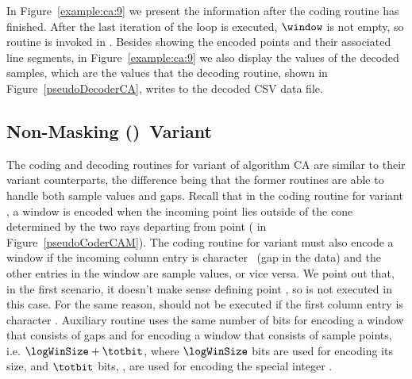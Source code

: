 \vspace{+5pt}


\clearpage


In Figure~\ref{example:ca:9} we present the information after the coding routine has finished. After the last iteration of the loop is executed, $\window$ is not empty, so routine \CAWinEnd is invoked in . Besides showing the encoded points and their associated line segments, in Figure~\ref{example:ca:9} we also display the values of the decoded samples, which are the values that the decoding routine, shown in Figure~\ref{pseudoDecoderCA}, writes to the decoded CSV data file. 


\vspace{+5pt}




\vspace{-10pt}
\subsection{Non-Masking (\NOmaskalgo)\ Variant}
\label{algo:ca:nmvariant}


The coding and decoding routines for variant \NOmaskalgo of algorithm CA are similar to their variant \maskalgo counterparts, the difference being that the former routines are able to handle both sample values and gaps. Recall that in the coding routine for variant \maskalgo, a window is encoded when the incoming point lies outside of the cone determined by the two rays departing from point \archived ( in Figure~\ref{pseudoCoderCAM}). The coding routine for variant \NOmaskalgo must also encode a window if the incoming column entry is character \noData\ (gap in the data) and the other entries in the window are sample values, or vice versa. We point out that, in the first scenario, it doesn't make sense defining point \archived, so  is not executed in this case. For the same reason,  should not be executed if the first column entry is character \noData. Auxiliary routine \CAWinEnd uses the same number of bits for encoding a window that consists of gaps and for encoding a window that consists of sample points, i.e. $\logWinSize+\totbit$, where $\logWinSize$ bits are used for encoding its size, and $\totbit$ bits, \wheretotbit, are used for encoding the special integer \nodata. 

